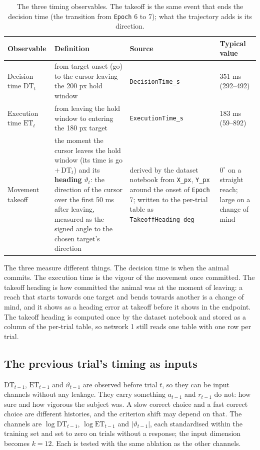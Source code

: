 \documentclass[11pt,a4paper]{article}
\begin{document}
\begin{table}[H]
  \centering\small
  \caption{The three timing observables. The takeoff is the same event that ends the
  decision time (the transition from \texttt{Epoch} 6 to 7); what the trajectory adds is
  its direction.}
  \label{tab:timing}
  \begin{tabular}{L{2.3cm}L{5.0cm}L{3.4cm}L{2.9cm}}
    \toprule
    Observable & Definition & Source & Typical value \\
    \midrule
    Decision time $\mathrm{DT}_t$ & from target onset (go) to the cursor leaving the 200 px hold window & \texttt{DecisionTime\_s} & 351 ms (292--492) \\
    Execution time $\mathrm{ET}_t$ & from leaving the hold window to entering the 180 px target & \texttt{ExecutionTime\_s} & 183 ms (59--892) \\
    Movement takeoff & the moment the cursor leaves the hold window (its time is go $+\,\mathrm{DT}_t$) and its \textbf{heading} $\vartheta_t$: the direction of the cursor over the first 50 ms after leaving, measured as the signed angle to the chosen target's direction & derived by the dataset notebook from \texttt{X\_px}, \texttt{Y\_px} around the onset of \texttt{Epoch} 7; written to the per-trial table as \texttt{TakeoffHeading\_deg} & $0^\circ$ on a straight reach; large on a change of mind \\
    \bottomrule
  \end{tabular}
\end{table}

The three measure different things. The decision time is when the animal commits. The
execution time is the vigour of the movement once committed. The takeoff heading is
how committed the animal was at the moment of leaving: a reach that starts towards one
target and bends towards another is a change of mind, and it shows as a heading error
at takeoff before it shows in the endpoint. The takeoff heading is computed once by the
dataset notebook and stored as a column of the per-trial table, so network 1 still reads
one table with one row per trial.

\subsection{The previous trial's timing as inputs}

$\mathrm{DT}_{t-1}$, $\mathrm{ET}_{t-1}$ and $\vartheta_{t-1}$ are observed before trial
$t$, so they can be input channels without any leakage. They carry something $a_{t-1}$
and $r_{t-1}$ do not: how sure and how vigorous the subject was. A slow correct choice
and a fast correct choice are different histories, and the criterion shift may depend on
that. The channels are $\log \mathrm{DT}_{t-1}$, $\log \mathrm{ET}_{t-1}$ and
$|\vartheta_{t-1}|$, each standardised within the training set and set to zero on
trials without a response; the input dimension becomes $k = 12$. Each is tested with the
same ablation as the other channels.
\end{document}
